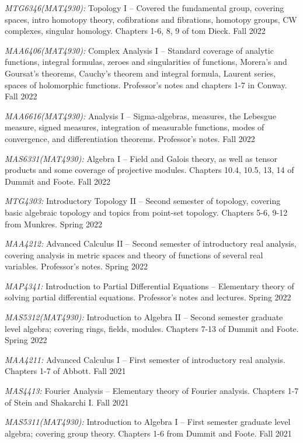 \documentclass[11pt]{article}
\begin{document}
\textsl{MTG6346(MAT4930)\textsuperscript{\textdagger}:} Topology I -- Covered the fundamental group, covering spaces, intro homotopy theory, cofibrations and fibrations, homotopy groups, CW complexes, singular homology. Chapters 1-6, 8, 9 of tom Dieck. Fall 2022

\textsl{MAA6406(MAT4930)\textsuperscript{\textdagger}:} Complex Analysis I -- Standard coverage of analytic functions, integral formulas, zeroes and singularities of functions, Morera's and Goursat's theorems, Cauchy's theorem and integral formula, Laurent series, spaces of holomorphic functions. Professor's notes and chapters 1-7 in Conway. Fall 2022

\textsl{MAA6616(MAT4930)\textsuperscript{\textdagger}:} Analysis I -- Sigma-algebras, measures, the Lebesgue measure, signed measures, integration of measurable functions, modes of convergence, and differentiation theorems. Professor's notes. Fall 2022

\textsl{MAS6331(MAT4930)\textsuperscript{\textdagger}:} Algebra I -- Field and Galois theory, as well as tensor products and some coverage of projective modules. Chapters 10.4, 10.5, 13, 14 of Dummit and Foote. Fall 2022

\textsl{MTG4303\textsuperscript{\textdagger}:} Introductory Topology II -- Second semester of topology, covering basic algebraic topology and topics from point-set topology. Chapters 5-6, 9-12 from Munkres. Spring 2022

\textsl{MAA4212:} Advanced Calculus II -- Second semester of introductory real analysis, covering analysis in metric spaces and theory of functions of several real variables. Professor's notes. Spring 2022

\textsl{MAP4341\textsuperscript{\textdagger}:} Introduction to Partial Differential Equations -- Elementary theory of solving partial differential equations. Professor's notes and lectures. Spring 2022

\textsl{MAS5312(MAT4930)\textsuperscript{\textdagger}:} Introduction to Algebra II -- Second semester graduate level algebra; covering rings, fields, modules. Chapters 7-13 of Dummit and Foote. Spring 2022

\textsl{MAA4211:} Advanced Calculus I -- First semester of introductory real analysis. Chapters 1-7 of Abbott. Fall 2021

\textsl{MAS4413:} Fourier Analysis -- Elementary theory of Fourier analysis. Chapters 1-7 of Stein and Shakarchi I. Fall 2021

\textsl{MAS5311(MAT4930)\textsuperscript{\textdagger}:} Introduction to Algebra I -- First semester graduate level algebra; covering group theory. Chapters 1-6 from Dummit and Foote. Fall 2021
\end{document}
